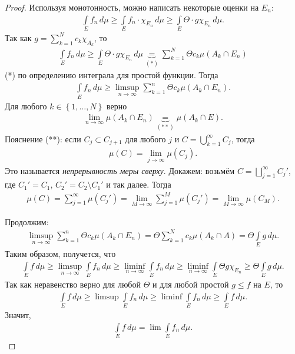\documentclass[a4paper,14pt]{extarticle}
\theoremstyle{definition}
\theoremstyle{plain}
\theoremstyle{plain}
\theoremstyle{plain}
\theoremstyle{plain}
\theoremstyle{definition}
\theoremstyle{definition}
\theoremstyle{definition}
\theoremstyle{definition}
\theoremstyle{definition}
\theoremstyle{definition}
\theoremstyle{plain}
\theoremstyle{plain}
\theoremstyle{plain}
\theoremstyle{plain}
\theoremstyle{definition}
\theoremstyle{definition}
\theoremstyle{definition}
\theoremstyle{definition}
\theoremstyle{definition}
\begin{document}
\begin{proof}
Используя монотонность, можно написать некоторые оценки на $E_n$: \begin{align*}
 \int\limits_E f_n \, d\mu \geqslant \int\limits_{E} f_n \cdot \chi_{E_n} \, d\mu \geqslant \int\limits_E \Theta \cdot g \chi_{E_n} \, d\mu
.\end{align*} Так как $g = \sum_{k=1}^{N} c_k \chi_{A_k}$, то \begin{align*}
\int\limits_E f_n \, d\mu \geqslant \int\limits_E \Theta \cdot g\chi_{E_n} \, d\mu \underbrace{=}_{(*)} \sum_{k=1}^{N} \Theta c_k \mu (A_k \cap E_n)
\end{align*}  (*) по определению интеграла для простой функции. Тогда \begin{align*}
\int\limits_E f_n\, d\mu \geqslant \limsup_{n \to \infty} \sum_{k=1}^{n} \Theta c_k \mu(A_k \cap E_n)
.\end{align*} Для любого $k \in \left\{ 1, \ldots, N \right\}$ верно \begin{align*}
\lim_{n\to \infty} \mu(A_k \cap E_n) \underbrace{=}_{(**)} \mu(A_k \cap E)
.\end{align*} Пояснение (**): если $C_j \subset C_{j+1}$ для любого $j$ и  $C = \bigcup_{k=1}^{\infty} C_j$, тогда \begin{align*}
\mu(C) = \lim_{j \to \infty} \mu(C_j)
.\end{align*} Это называется \textit{непрерывность меры сверху}. Докажем: возьмём $C = \bigsqcup_{j=1}^{\infty} C_j' $, где $C_1' = C_1$,  $C_2' = C_2 \setminus C_1'$ и так далее. Тогда \begin{align*}
\mu(C) = \sum_{j=1}^{\infty} \mu( C_j' ) = \lim_{M \to \infty} \sum_{j=1}^{M}  \mu(C_j') = \lim_{M \to \infty} \mu(C_M)
.\end{align*} 

Продолжим: \begin{align*}
 \limsup_{n \to \infty} \sum_{k=1}^{n} \Theta c_k \mu(A_k \cap E_n) = \Theta \sum_{k=1}^{N} c_k \mu(A_k \cap A) = \Theta \int\limits_E g \, d\mu
.\end{align*}  Таким образом, получется, что \begin{align*}
\int\limits_E f \, d\mu \geqslant \limsup_{n \to \infty} \int\limits_E f_n\, d\mu \geqslant \liminf_{n \to \infty} \int\limits_E f_n \, d\mu \geqslant \liminf_{n \to \infty} \int\limits_E \Theta g \chi_{E_n} \geqslant \Theta \int\limits_E g\, d\mu
.\end{align*} Так как неравенство верно для любой $\Theta$ и для любой простой $g \leqslant f$ на $E $, то \begin{align*}
\int\limits_E f \, d\mu \geqslant \limsup \int\limits_E f_n \, d\mu \geqslant \liminf \int\limits_E f_n \, d\mu \geqslant \int\limits_E f \, d\mu
.\end{align*} Значит, \begin{align*}
 \int\limits_E f \, d\mu = \lim \int\limits_E f_n \, d\mu
.\end{align*} 
\end{proof}
\end{document}
